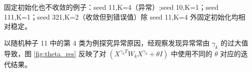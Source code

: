 \documentclass[12pt, a4paper, oneside]{article}
\numberwithin{equation}{section}
\begin{document}
固定初始化也不收敛的例子：seed 11,K=4（异常）;seed 10,K=1；seed 111,K=1；seed 321,K=2（收敛但到错误值）除 seed 11,K=4 外固定初始化均相对稳定。


以随机种子 11 中的第 4 类为例探究异常原因，经观察发现异常常由 $\gamma_k$ 的过大值导致，图 \ref{fig:theta_res} 反映了对 $(X^{\gamma_k T}W_k X^{\gamma_k} + \theta I)$ 中使用不同的 $\theta$ 对应的迭代结果。

\begin{figure}
	\centering


\end{figure}
\end{document}
